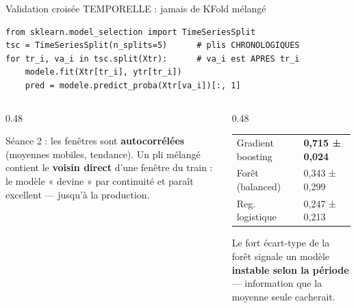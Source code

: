 \begin{frame}[fragile]{Validation croisée TEMPORELLE : jamais de KFold mélangé}
\footnotesize%
\begin{codebox}
\begin{lstlisting}
from sklearn.model_selection import TimeSeriesSplit
tsc = TimeSeriesSplit(n_splits=5)      # plis CHRONOLOGIQUES
for tr_i, va_i in tsc.split(Xtr):      # va_i est APRES tr_i
    modele.fit(Xtr[tr_i], ytr[tr_i])
    pred = modele.predict_proba(Xtr[va_i])[:, 1]
\end{lstlisting}
\end{codebox}
\begin{columns}[t]
\begin{column}{0.48\textwidth}
\begin{wbox}
Séance 2 : les fenêtres sont \textbf{autocorrélées} (moyennes
mobiles, tendance). Un pli mélangé contient le \textbf{voisin
direct} d'une fenêtre du train : le modèle « devine » par
continuité et paraît excellent --- jusqu'à la production.
\end{wbox}
\end{column}
\begin{column}{0.48\textwidth}
\begin{ebox}
\begin{center}\small
\begin{tabular}{@{}l l@{}}
\toprule
Gradient boosting & \textbf{0,715 ± 0,024}\\
Forêt (balanced) & 0,343 ± 0,299\\
Reg. logistique & 0,247 ± 0,213\\
\bottomrule
\end{tabular}
\end{center}
Le fort écart-type de la forêt signale un modèle
\textbf{instable selon la période} --- information que la moyenne
seule cacherait.
\end{ebox}
\end{column}
\end{columns}
\end{frame}

